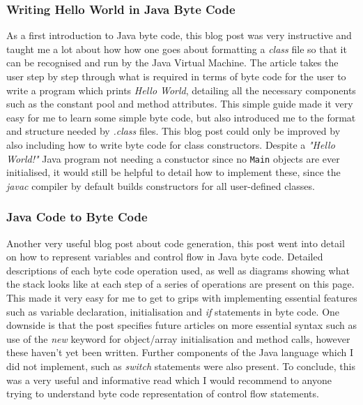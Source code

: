 \documentclass[a4paper, 11pt]{article}
\begin{document}
\subsubsection{Writing Hello World in Java Byte Code\cite{HelloWorld}}
As a first introduction to Java byte code, this blog post was very instructive and taught me a lot about how how one goes about formatting a \textit{class} file so that it can be recognised and run by the Java Virtual Machine. The article takes the user step by step through what is required in terms of byte code for the user to write a program which prints \textit{Hello World}, detailing all the necessary components such as the constant pool and method attributes. This simple guide made it very easy for me to learn some simple byte code, but also introduced me to the format and structure needed by \textit{.class} files. This blog post could only be improved by also including how to write byte code for class constructors. Despite a \textit{"Hello World!"} Java program not needing a constuctor since no \texttt{Main} objects are ever initialised, it would still be helpful to detail how to implement these, since the \textit{javac} compiler by default builds constructors for all user-defined classes. 

\subsubsection{Java Code to Byte Code\cite{JavaToByteCode}}
Another very useful blog post about code generation, this post went into detail on how to represent variables and control flow in Java byte code. Detailed descriptions of each byte code operation used, as well as diagrams showing what the stack looks like at each step of a series of operations are present on this page. This made it very easy for me to get to grips with implementing essential features such as variable declaration, initialisation and \textit{if} statements in byte code. One downside is that the post specifies future articles on more essential syntax such as use of the \textit{new} keyword for object/array initialisation and method calls, however these haven't yet been written. Further components of the Java language which I did not implement, such as \textit{switch} statements were also present. To conclude, this was a very useful and informative read which I would recommend to anyone trying to understand byte code representation of control flow statements. 
\end{document}
